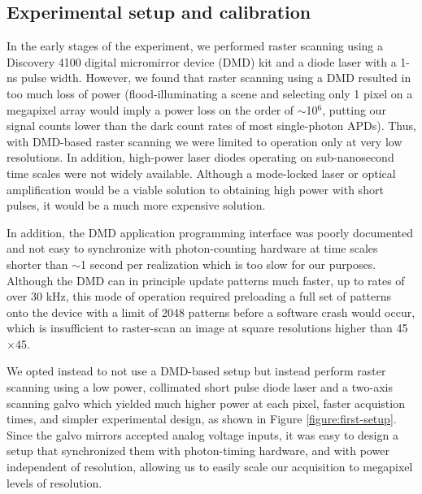 \subsection{Experimental setup and calibration}

In the early stages of the experiment, we performed raster scanning using a Discovery 4100 digital micromirror device (DMD) kit and a diode laser with a 1-ns pulse width. However, we found that raster scanning using a DMD resulted in too much loss of power (flood-illuminating a scene and selecting only 1 pixel on a megapixel array would imply a power loss on the order of $\sim$10$^6$, putting our signal counts lower than the dark count rates of most single-photon APDs). Thus, with DMD-based raster scanning we were limited to operation only at very low resolutions. In addition, high-power laser diodes operating on sub-nanosecond time scales were not widely available. Although a mode-locked laser or optical amplification would be a viable solution to obtaining high power with short pulses, it would be a much more expensive solution.

In addition, the DMD application programming interface was poorly documented and not easy to synchronize with photon-counting hardware at time scales shorter than $\sim$1 second per realization which is too slow for our purposes. Although the DMD can in principle update patterns much faster, up to rates of over 30 kHz, this mode of operation required preloading a full set of patterns onto the device with a limit of 2048 patterns before a software crash would occur, which is insufficient to raster-scan an image at square resolutions higher than 45$\times$45.

We opted instead to not use a DMD-based setup but instead perform raster scanning using a low power, collimated short pulse diode laser and a two-axis scanning galvo which yielded much higher power at each pixel, faster acquistion times, and simpler experimental design, as shown in Figure \ref{figure:first-setup}. Since the galvo mirrors accepted analog voltage inputs, it was easy to design a setup that synchronized them with photon-timing hardware, and with power independent of resolution, allowing us to easily scale our acquisition to megapixel levels of resolution.

